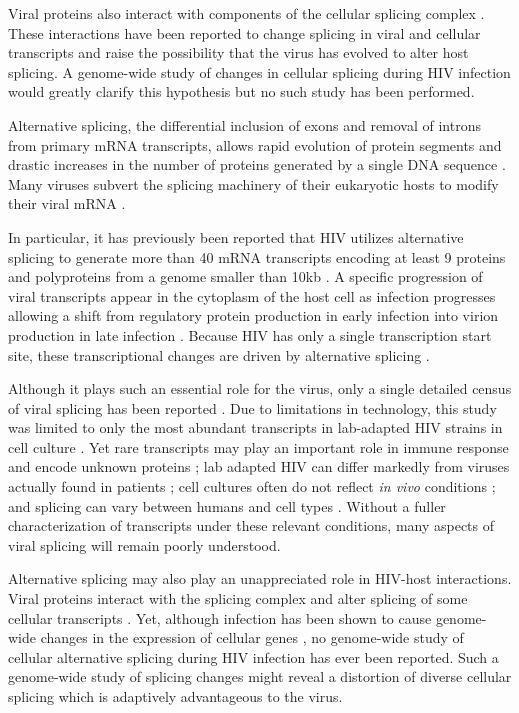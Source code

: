 \documentclass[../sherrill-Mix_thesis.tex]{subfiles}
\begin{document}
	Viral proteins also interact with components of the cellular splicing complex \citep{Tange1996,Berro2006,Jager2012}. These interactions have been reported to change splicing in viral\citep{Berro2006,Bohne2007,Jablonski2010} and cellular transcripts \citep{Kuramitsu2005,Hashizume2007} and raise the possibility that the virus has evolved to alter host splicing. A genome-wide study of changes in cellular splicing during HIV infection would greatly clarify this hypothesis but no such study has been performed. 

	Alternative splicing, the differential inclusion of exons and removal of introns from primary mRNA transcripts, allows rapid evolution of protein segments \citep{Kopelman2005,Xing2005,Su2006} and drastic increases in the number of proteins generated by a single DNA sequence \citep{Watson2005}. Many viruses subvert the splicing machinery of their eukaryotic hosts to modify their viral mRNA \citep{Pollard1998}. 

	In particular, it has previously been reported that HIV utilizes alternative splicing to generate more than 40 mRNA transcripts encoding at least 9 proteins and polyproteins from a genome smaller than 10kb \citep{Purcell1993}. A specific progression of viral transcripts appear in the cytoplasm of the host cell as infection progresses allowing a shift from regulatory protein production in early infection into virion production in late infection \citep{Kim1989,Pomerantz1990,Klotman1991}. Because HIV has only a single transcription start site, these transcriptional changes are driven by alternative splicing \citep{Stoltzfus2009}. 

	 Although it plays such an essential role for the virus, only a single detailed census of viral splicing has been reported \citep{Purcell1993}. Due to limitations in technology, this study was limited to only the most abundant transcripts in lab-adapted HIV strains in cell culture \citep{Purcell1993}. Yet rare transcripts may play an important role in immune response \citep{Bansal2010} and encode unknown proteins \citep{Benko1990}; lab adapted HIV can differ markedly from viruses actually found in patients \citep{Fujita1992};  cell cultures often do not reflect \emph{in vivo} conditions \citep{McAllister1971}; and splicing can vary between humans \citep{Kwan2007,Hull2007} and cell types \citep{Wang2008,Barash2010}. Without a fuller characterization of transcripts under these relevant conditions, many aspects of viral splicing will remain poorly understood.

	Alternative splicing may also play an unappreciated role in HIV-host interactions. Viral proteins interact with the splicing complex \citep{Tange1996,Berro2006,Jager2012} and alter splicing of some cellular transcripts \citep{Kuramitsu2005,Hashizume2007}. Yet, although infection has been shown to cause genome-wide changes in the expression of cellular genes \citep{Vahey2002,Wout2003,Mitchell2003,Rotger2010,Chang2011}, no genome-wide study of cellular alternative splicing during HIV infection has ever been reported. Such a genome-wide study of splicing changes might reveal a distortion of diverse cellular splicing which is adaptively advantageous to the virus. 
\end{document}
